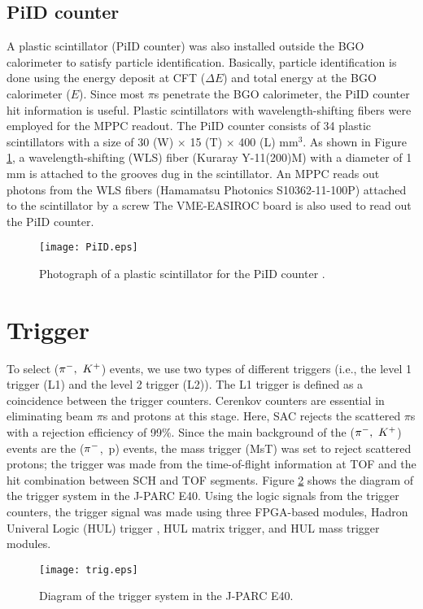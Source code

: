 \subsection{PiID counter}
A plastic scintillator (PiID counter) was also installed outside the BGO calorimeter to satisfy particle identification. Basically, particle identification is done using the energy deposit at CFT ($\Delta E$) and total energy at the BGO calorimeter ($E$). Since most $\pi$s penetrate the BGO calorimeter, the PiID counter hit information is useful. Plastic scintillators with wavelength-shifting fibers were employed for the MPPC readout. The PiID counter consists of 34 plastic scintillators with a size of 30 (W) $\times$ 15 (T) $\times$ 400 (L) mm$^{3}$. As shown in Figure \ref{fig-PiID}, a wavelength-shifting (WLS) fiber (Kuraray Y-11(200)M) with a diameter of 1 mm is attached to the grooves dug in the scintillator. An MPPC reads out photons from the WLS fibers (Hamamatsu Photonics S10362-11-100P) attached to the scintillator by a screw The VME-EASIROC board is also used to read out the PiID counter.
\begin{figure}[!h]
 \begin{center}
   \texttt{[image: PiID.eps]}
   \caption{Photograph of a plastic scintillator for the PiID counter \cite{Aka-2020}.}
   \label{fig-PiID}
 \end{center}
\end{figure}

\section{Trigger}
To select ($\pi^{-},\ K^{+}$) events, we use two types of different triggers (i.e., the level 1 trigger (L1) and the level 2 trigger (L2)). The L1 trigger is defined as a coincidence between the trigger counters. Cerenkov counters are essential in eliminating beam $\pi$s and protons at this stage. Here, SAC rejects the scattered $\pi$s with a rejection efficiency of 99\%. Since the main background of the ($\pi^{-},\ K^{+}$) events are the ($\pi^{-}$,\ p) events, the mass trigger (MsT) was set to reject scattered protons; the trigger was made from the time-of-flight information at TOF and the hit combination between SCH and TOF segments. Figure \ref{fig-trig} shows the diagram of the trigger system in the J-PARC E40. Using the logic signals from the trigger counters, the trigger signal was made using three FPGA-based modules, Hadron Univeral Logic (HUL) trigger \cite{Hoshino-M}, HUL matrix trigger, and HUL mass trigger modules. 
\begin{figure}[!h]
 \begin{center}
   \texttt{[image: trig.eps]}
   \caption{Diagram of the trigger system in the J-PARC E40.}
   \label{fig-trig}
 \end{center}
\end{figure}

